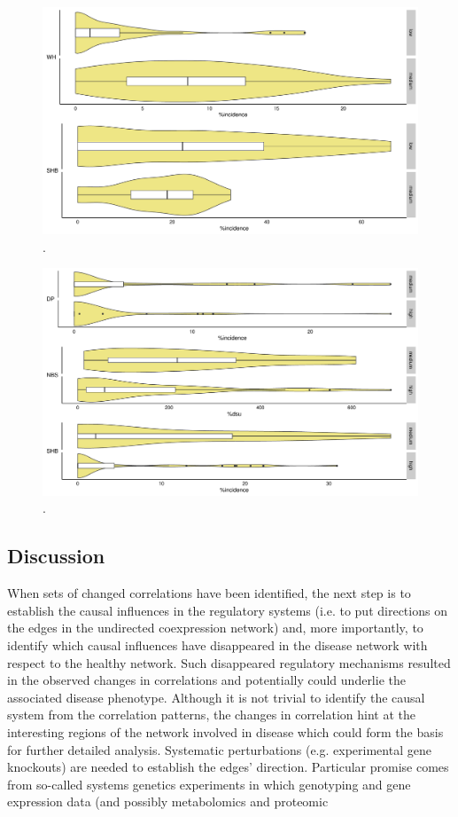 \begin{figure}
        \includegraphics[width = 1\textwidth]{figures/TM_yield_box.pdf}
        \caption{.}
\label{fig:yield.box_TM}
\end{figure}

\begin{figure}
        \includegraphics[width = 1\textwidth]{figures/WJ_yield_box.pdf}
        \caption{.}
\label{fig:yield.box_WJ}
\end{figure}


\clearpage
\subsection{Discussion}
When sets of changed correlations have been identified,
the next step is to establish the causal influences in the
regulatory systems (i.e. to put directions on the edges in the
undirected coexpression network) and, more importantly,
to identify which causal influences have disappeared in the
disease network with respect to the healthy network. Such
disappeared regulatory mechanisms resulted in the
observed changes in correlations and potentially could
underlie the associated disease phenotype. Although it is
not trivial to identify the causal system from the correlation
patterns, the changes in correlation hint at the
interesting regions of the network involved in disease
which could form the basis for further detailed analysis.
Systematic perturbations (e.g. experimental gene knockouts)
are needed to establish the edges’ direction. Particular
promise comes from so-called systems genetics
experiments in which genotyping and gene expression data
(and possibly metabolomics and proteomic

